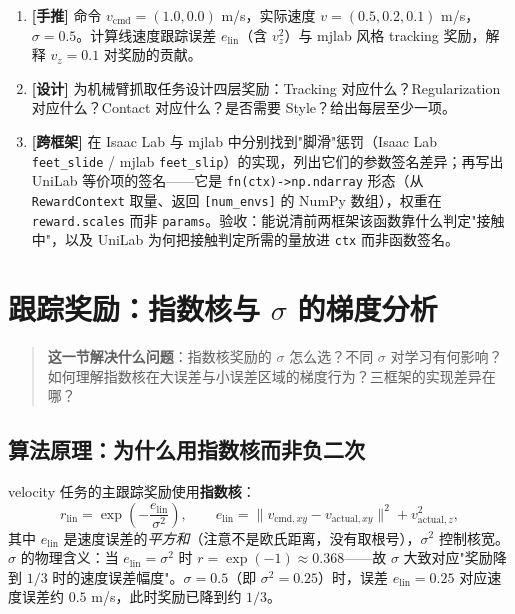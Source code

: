 \begin{practice}[练习·四层分解]
\begin{enumerate}
  \item \textbf{[手推]} 命令 $v_{\text{cmd}}=(1.0,0.0)$ m/s，实际速度 $v=(0.5,0.2,0.1)$ m/s，$\sigma=0.5$。计算线速度跟踪误差 $e_{\text{lin}}$（含 $v_z^2$）与 mjlab 风格 tracking 奖励，解释 $v_z=0.1$ 对奖励的贡献。
  \item \textbf{[设计]} 为机械臂抓取任务设计四层奖励：Tracking 对应什么？Regularization 对应什么？Contact 对应什么？是否需要 Style？给出每层至少一项。
  \item \textbf{[跨框架]} 在 Isaac Lab 与 mjlab 中分别找到"脚滑"惩罚（Isaac Lab \verb|feet_slide| / mjlab \verb|feet_slip|）的实现，列出它们的参数签名差异；再写出 UniLab 等价项的签名——它是 \verb|fn(ctx)->np.ndarray| 形态（从 \verb|RewardContext| 取量、返回 \verb|[num_envs]| 的 NumPy 数组），权重在 \verb|reward.scales| 而非 \verb|params|。验收：能说清前两框架该函数靠什么判定"接触中"，以及 UniLab 为何把接触判定所需的量放进 \verb|ctx| 而非函数签名。
\end{enumerate}
\end{practice}

\section{\texorpdfstring{跟踪奖励：指数核与 $\sigma$ 的梯度分析}{跟踪奖励：指数核与 sigma 的梯度分析}}
\label{sec:rlmc-rew-track}

\begin{quote}\small
\textbf{这一节解决什么问题}：指数核奖励的 $\sigma$ 怎么选？不同 $\sigma$ 对学习有何影响？如何理解指数核在大误差与小误差区域的梯度行为？三框架的实现差异在哪？
\end{quote}

\subsection{算法原理：为什么用指数核而非负二次}
\label{sec:rlmc-rew-expkernel}

velocity 任务的主跟踪奖励使用\textbf{指数核}：
\begin{equation}
r_{\text{lin}}=\exp\!\left(-\frac{e_{\text{lin}}}{\sigma^2}\right),\qquad
e_{\text{lin}}=\lVert v_{\text{cmd},xy}-v_{\text{actual},xy}\rVert^2+v_{\text{actual},z}^2,
\label{eq:rlmc-rew-explin}
\end{equation}
其中 $e_{\text{lin}}$ 是速度误差的\emph{平方和}（注意不是欧氏距离，没有取根号），$\sigma^2$ 控制核宽。$\sigma$ 的物理含义：当 $e_{\text{lin}}=\sigma^2$ 时 $r=\exp(-1)\approx0.368$——故 $\sigma$ 大致对应"奖励降到 $1/3$ 时的速度误差幅度"。$\sigma=0.5$（即 $\sigma^2=0.25$）时，误差 $e_{\text{lin}}=0.25$ 对应速度误差约 $0.5$ m/s，此时奖励已降到约 $1/3$。

